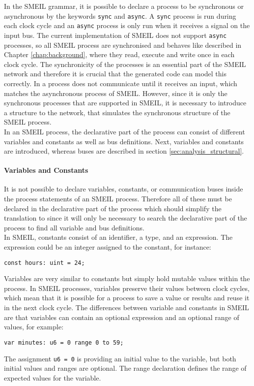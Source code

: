 In the SMEIL grammar, it is possible to declare a process to be synchronous or asynchronous by the keywords \texttt{sync} and \texttt{async}. A \texttt{sync} process is run during each clock cycle and an \texttt{async} process is only run when it receives a signal on the input bus. The current implementation of SMEIL does not support \texttt{async} processes, so all SMEIL process are synchronised and behaves like described in Chapter \ref{chap:background}, where they read, execute and write once in each clock cycle. The synchronicity of the processes is an essential part of the SMEIL network and therefore it is crucial that the generated code can model this correctly. In \cspm{} a process does not communicate until it receives an input, which matches the asynchronous process of SMEIL. However, since it is only the synchronous processes that are supported in SMEIL, it is necessary to introduce a structure to the \cspm{} network, that simulates the synchronous structure of the SMEIL process.\\

In an SMEIL process, the declarative part of the process can consist of different variables and constants as well as bus definitions. Next, variables and constants are introduced, whereas buses are described in section \ref{sec:analysis_structural}.
\paragraph{Variables and Constants}
It is not possible to declare variables, constants, or communication buses inside the process statements of an SMEIL process. Therefore all of these must be declared in the declarative part of the process which should simplify the translation to \cspm{} since it will only be necessary to search the declarative part of the process to find all variable and bus definitions.\\

In SMEIL, constants consist of an identifier, a type, and an expression. The expression could be an integer assigned to the constant, for instance:
\begin{verbatim}
const hours: uint = 24;
\end{verbatim}
Variables are very similar to constants but simply hold mutable values within the process. In SMEIL processes, variables preserve their values between clock cycles, which mean that it is possible for a process to save a value or results and reuse it in the next clock cycle. The differences between variable and constants in SMEIL are that variables can contain an optional expression and an optional range of values, for example:
\begin{verbatim}
var minutes: u6 = 0 range 0 to 59;
\end{verbatim}
The assignment \texttt{u6 = 0} is providing an initial value to the variable, but both initial values and ranges are optional. The range declaration defines the range of expected values for the variable. \\


